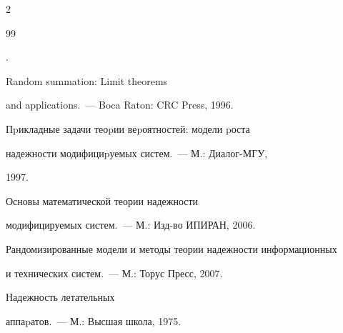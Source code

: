 \begin{multicols}{2}





{\small\frenchspacing


{%




\begin{thebibliography}{99}







.


Random summation: Limit theorems


and applications.~--- Boca Raton: CRC Press, 1996. %









Пpикладные задачи теоpии веpоятностей: модели pоста


надежности модифициpуемых сис\-тем.~--- М.: Диалог-МГУ,


1997. %









Основы математической теории надежности


модифицируемых систем.~--- М.: Изд-во ИПИРАН, 2006. %









Рандомизированные модели и методы теории надежности информационных


и технических систем.~--- М.: Торус Пресс, 2007. %









Надежность летательных


аппаpатов.~--- М.: Высшая школа, 1975. %






\end{thebibliography}}}
\end{multicols}
